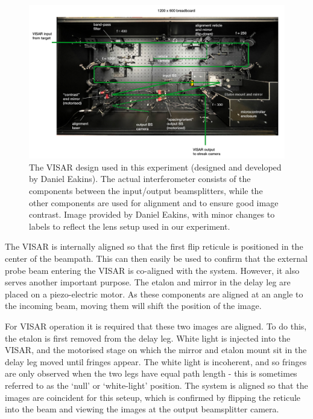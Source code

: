\begin{figure}
\includegraphics[width=1.0\textwidth]{figures/Experiment/Dan_VISAR.PNG}%
\caption{\label{fig:Dan_VISAR} The VISAR design used in this experiment (designed and developed by Daniel Eakins). The actual interferometer consists of the components between the input/output beamsplitters, while the other components are used for alignment and to ensure good image contrast. Image provided by Daniel Eakins, with minor changes to labels to reflect the lens setup used in our experiment. }
\end{figure}

The VISAR is internally aligned so that the first flip reticule is positioned in the center of the beampath. This can then easily be used to confirm that the external probe beam entering the VISAR is co-aligned with the system. However, it also serves another important purpose. The etalon and mirror in the delay leg are placed on a piezo-electric motor. As these components are aligned at an angle to the incoming beam, moving them will shift the position of the image. 

For VISAR operation it is required that these two images are aligned. To do this, the etalon is first removed from the delay leg. White light is injected into the VISAR, and the motorised stage on which the mirror and etalon mount sit in the delay leg moved until fringes appear. The white light is incoherent, and so fringes are only observed when the two legs have equal path length - this is sometimes referred to as the `null' or `white-light' position. The system is aligned so that the images are coincident for this seteup, which is confirmed by flipping the reticule into the beam and viewing the images at the output beamsplitter camera.


